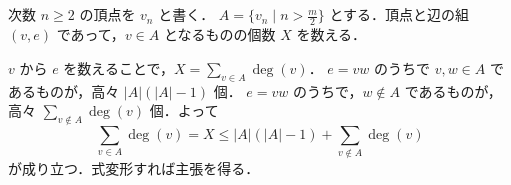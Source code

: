 \subsection{}
次数 $n\geq 2$ の頂点を $v_n$ と書く．
$A = \{v_n\mid n > \frac{m}{2}\}$ とする．頂点と辺の組 $(v,e)$ であって，$v\in A$ となるものの個数 $X$ を数える．

$v$ から $e$ を数えることで，$X = \sum_{v\in A} \deg(v)$．
$e=vw$ のうちで $v,w\in A$ であるものが，高々 $|A|(|A|-1)$ 個．
$e=vw$ のうちで，$w\notin A$ であるものが，高々 $\sum_{v\notin A}\deg(v)$ 個．よって
\[
 \sum_{v\in A}\deg(v) = X \leq |A|(|A|-1) + \sum_{v\notin A}\deg(v)
\]
が成り立つ．式変形すれば主張を得る．